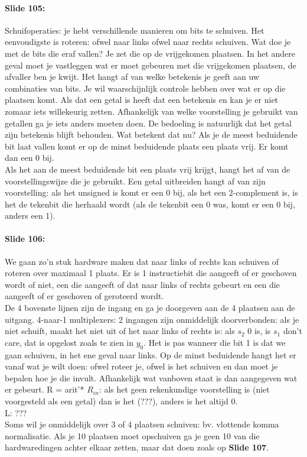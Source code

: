 \documentclass[10pt,a4paper]{book}
\begin{document}
\paragraph{Slide 105:} Schuifoperaties: je hebt verschillende manieren om bits te schuiven. Het eenvoudigste is roteren: ofwel naar links ofwel naar rechts schuiven. Wat doe je met de bits die eraf vallen? Je zet die op de vrijgekomen plaatsen. In het andere geval moet je vastleggen wat er moet gebeuren met die vrijgekomen plaatsen, de afvaller ben je kwijt. Het hangt af van welke betekenis je geeft aan uw combinaties van bits. Je wil waarschijnlijk controle hebben over wat er op die plaatsen komt. Als dat een getal is heeft dat een betekenis en kan je er niet zomaar iets willekeurig zetten. Afhankelijk van welke voorstelling je gebruikt van getallen ga je iets anders moeten doen. De bedoeling is natuurlijk dat het getal zijn betekenis blijft behouden. Wat betekent dat nu? Als je de meest beduidende bit laat vallen komt er op de minst beduidende plaats een plaats vrij. Er komt dan een 0 bij.\\
Als het aan de meest beduidende bit een plaats vrij krijgt, hangt het af van de voorstellingswijze die je gebruikt. Een getal uitbreiden hangt af van zijn voorstelling: als het unsigned is komt er een 0 bij, als het een 2-complement is, is het de tekenbit die herhaald wordt (als de tekenbit een 0 was, komt er een 0 bij, anders een 1).

\paragraph{Slide 106:} We gaan zo'n stuk hardware maken dat naar links of rechts kan schuiven of roteren over maximaal 1 plaats. Er is 1 instructiebit die aangeeft of er geschoven wordt of niet, een die aangeeft of dat naar links of rechts gebeurt en een die aangeeft of er geschoven of geroteerd wordt.\\
De 4 bovenste lijnen zijn de ingang en ga je doorgeven aan de 4 plaatsen aan de uitgang. 4-naar-1 multiplexers: 2 ingangen zijn onmiddelijk doorverbonden: als je niet schuift, maakt het niet uit of het naar links of rechts is: als $s_2 $ 0 is, is $s_1$ don't care, dat is opgelost zoals te zien in $y_0$. Het is pas wanneer die bit 1 is dat we gaan schuiven, in het ene geval naar links. Op de minst beduidende hangt het er vanaf wat je wilt doen: ofwel roteer je, ofwel is het schuiven en dan moet je bepalen hoe je die invult. Afhankelijk wat vanboven staat is dan aangegeven wat er gebeurt. R = arit'* $R_{in}$: als het geen rekenkundige voorstelling is (niet voorgesteld als een getal) dan is het (???), anders is het altijd 0.\\
L: ???\\
Soms wil je onmiddelijk over 3 of 4 plaatsen schuiven: bv. vlottende komma normalisatie. Als je 10 plaatsen moet opschuiven ga je geen 10 van die hardwaredingen achter elkaar zetten, maar dat doen zoals op \textbf{Slide 107}.
\end{document}
